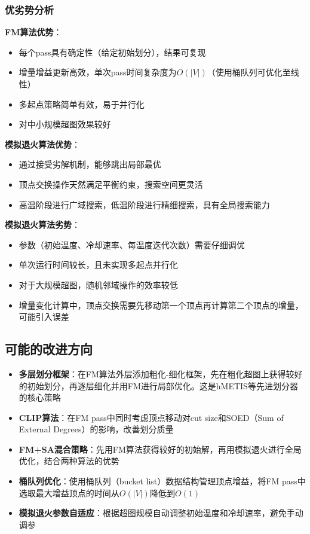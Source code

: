 \documentclass{SYSUReport}
\begin{document}
\subsubsection{优劣势分析}
\textbf{FM算法优势}：
\begin{itemize}
\item 每个pass具有确定性（给定初始划分），结果可复现
\item 增量增益更新高效，单次pass时间复杂度为$O(|V|)$（使用桶队列可优化至线性）
\item 多起点策略简单有效，易于并行化
\item 对中小规模超图效果较好
\end{itemize}

\textbf{模拟退火算法优势}：
\begin{itemize}
\item 通过接受劣解机制，能够跳出局部最优
\item 顶点交换操作天然满足平衡约束，搜索空间更灵活
\item 高温阶段进行广域搜索，低温阶段进行精细搜索，具有全局搜索能力
\end{itemize}

\textbf{模拟退火算法劣势}：
\begin{itemize}
\item 参数（初始温度、冷却速率、每温度迭代次数）需要仔细调优
\item 单次运行时间较长，且未实现多起点并行化
\item 对于大规模超图，随机邻域操作的效率较低
\item 增量变化计算中，顶点交换需要先移动第一个顶点再计算第二个顶点的增量，可能引入误差
\end{itemize}

\subsection{可能的改进方向}
\begin{itemize}
\item \textbf{多层划分框架}：在FM算法外层添加粗化-细化框架，先在粗化超图上获得较好的初始划分，再逐层细化并用FM进行局部优化。这是hMETIS等先进划分器的核心策略
\item \textbf{CLIP算法}：在FM pass中同时考虑顶点移动对cut size和SOED（Sum of External Degrees）的影响，改善划分质量
\item \textbf{FM+SA混合策略}：先用FM算法获得较好的初始解，再用模拟退火进行全局优化，结合两种算法的优势
\item \textbf{桶队列优化}：使用桶队列（bucket list）数据结构管理顶点增益，将FM pass中选取最大增益顶点的时间从$O(|V|)$降低到$O(1)$
\item \textbf{模拟退火参数自适应}：根据超图规模自动调整初始温度和冷却速率，避免手动调参
\end{itemize}
\end{document}
